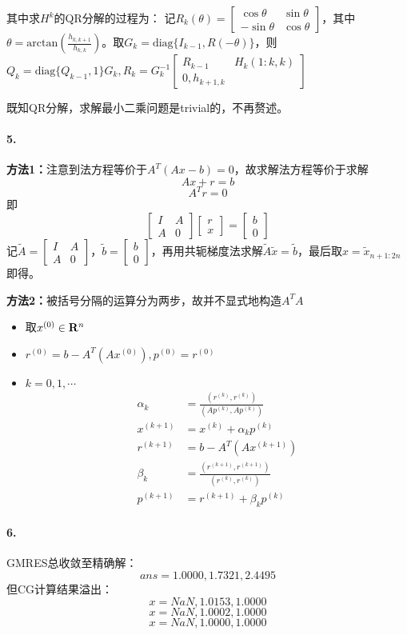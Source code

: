 \documentclass{ctexart}
\begin{document}
其中求$H^k$的QR分解的过程为：
记$R_k(\theta)=\begin{bmatrix}\cos\theta&\sin\theta\\-\sin\theta&\cos\theta\end{bmatrix}$，其中$\theta=\mathrm{arctan}(\frac{h_{k,k+1}}{h_{k,k}})$。取$G_k=\mathrm{diag}\{I_{k-1},R(-\theta)\}$，则$Q_k=\mathrm{diag}\{Q_{k-1},1\}G_k,R_k=G^{-1}_k\begin{bmatrix}R_{k-1}&H_{k}(1:k,k)\\0,h_{k+1,k}\end{bmatrix}$

既知QR分解，求解最小二乘问题是trivial的，不再赘述。

\paragraph{5.}
\textbf{方法1：}注意到法方程等价于$A^T(Ax-b)=0$，故求解法方程等价于求解
\[Ax+r=b\]
\[A^Tr=0\]
即
\[\begin{bmatrix}I&A\\A&0\end{bmatrix}\begin{bmatrix}r\\x\end{bmatrix}=\begin{bmatrix}b\\ 0\end{bmatrix}\]
记$\tilde{A}=\begin{bmatrix}I&A\\A&0\end{bmatrix}$，$\tilde{b}=\begin{bmatrix}b\\ 0\end{bmatrix}$，再用共轭梯度法求解$\tilde{A}\tilde{x}=\tilde b$，最后取$x=\tilde{x}_{n+1:2n}$即得。

\textbf{方法2：}被括号分隔的运算分为两步，故并不显式地构造$A^TA$
\begin{itemize}
\item 取$x^{(0)}\in \mathbf{R}^n$
\item $r^{(0)}=b-A^T(Ax^{(0)}),p^{(0)}=r^{(0)}$
\item $k=0,1,\cdots$
\begin{align*}
\alpha_k&=\frac{(r^{(k)},r^{(k)})}{(Ap^{(k)},Ap^{(k)})}\\
x^{(k+1)}&=x^{(k)}+\alpha_kp^{(k)}\\
r^{(k+1)}&=b-A^T(Ax^{(k+1)})\\
\beta_k&=\frac{(r^{(k+1)},r^{(k+1)})}{(r^{(k)},r^{(k)})}\\
p^{(k+1)}&=r^{(k+1)}+\beta_kp^{(k)}
\end{align*}
\end{itemize}

\paragraph{6.}
GMRES总收敛至精确解：
\[ans =
    1.0000,
    1.7321,
    2.4495\]
但CG计算结果溢出：
\[x =
       NaN ,   1.0153 ,   1.0000\]
\[x =
       NaN ,   1.0002 ,   1.0000\]
\[x =
       NaN  ,  1.0000  ,  1.0000\]
\end{document}
